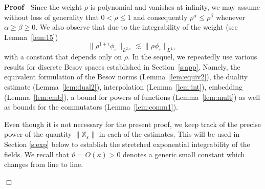 \documentclass[a4paper,11pt]{article}
\newenvironment{proof}{\noindent\textbf{Proof\ }}{\hspace*{\fill}$\Box$\medskip}
\numberwithin{equation}{section}
\begin{document}
\begin{proof}
  Since the weight $\rho$ is polynomial and vanishes at infinity, we may
  assume without loss of generality that $0 < \rho \leqslant 1$ and
  consequently $\rho^{\alpha} \leqslant \rho^{\beta}$ whenever $\alpha
  \geqslant \beta \geqslant 0$. We also observe that due to the integrability
  of the weight (see Lemma~\ref{lem:15})
  \[ \| \rho^{1 + \iota} \phi_{\varepsilon} \|_{L^{2, \varepsilon}} \lesssim
     \| \rho \phi_{\varepsilon} \|_{L^{4, \varepsilon}} \]
  with a constant that depends only on $\rho$. In the sequel, we repeatedly
  use various results for discrete Besov spaces established in
  Section~\ref{s:app}. Namely, the equivalent formulation of the Besov norms
  (Lemma~\ref{lem:equiv2}), the duality estimate (Lemma~\ref{lem:dual2}),
  interpolation (Lemma~\ref{lem:int}), embedding (Lemma~\ref{lem:emb}), a
  bound for powers of functions (Lemma~\ref{lem:mult}) as well as bounds for
  the commutators (Lemma~\ref{lem:comm1}).
  
  Even though it is not necessary for the present proof, we keep track of the precise power of the quantity $\|\mathbb {X}_{\varepsilon}\|$ in each of the estimates. This will be used in Section \ref{s:exp} below to establish the stretched exponential integrability of the fields. We recall that $\vartheta=O(\kappa)>0$ denotes a generic small constant which changes from line to line.
  

\end{proof}
\end{document}
